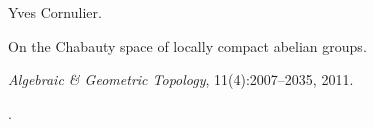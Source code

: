 Yves Cornulier.

\newblock On the {Chabauty} space of locally compact abelian groups.

\newblock \emph{Algebraic \& Geometric Topology}, 11(4):2007--2035, 2011.

\newblock {}.

